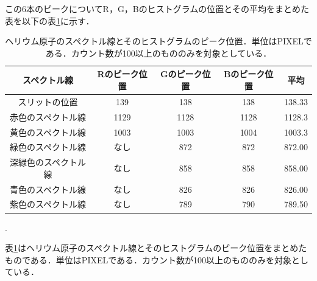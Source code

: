 \documentclass[a4paper,dvipdfmx,10.5pt]{jarticle}
\begin{document}
この6本のピークについてR，G，Bのヒストグラムの位置とその平均をまとめた表を以下の表\ref{tab:He_spectrum}に示す．
\begin{table}[htbp]
  \begin{center}
    \begin{tabular}{|c|c|c|c|c|}
       \hline
    スペクトル線 & Rのピーク位置 & Gのピーク位置 & Bのピーク位置& 平均 \\
      \hline
      スリットの位置 & 139 & 138 & 138 & 138.33 \\
    赤色のスペクトル線 & 1129 & 1128& 1128 & 1128.3 \\
    黄色のスペクトル線 & 1003 & 1003 & 1004 & 1003.3\\
    緑色のスペクトル線 & なし & 872 & 872 & 872.00 \\
    深緑色のスペクトル線 & なし & 858 & 858 & 858.00 \\
    青色のスペクトル線 & なし & 826 & 826 & 826.00 \\
    紫色のスペクトル線 & なし & 789 & 790 & 789.50 \\
    \hline
    \end{tabular}
    \caption{ヘリウム原子のスペクトル線とそのヒストグラムのピーク位置．単位はPIXELである．カウント数が100以上のもののみを対象としている．}
    .\label{tab:He_spectrum}
  \end{center}
\end{table}
表\ref{tab:He_spectrum}はヘリウム原子のスペクトル線とそのヒストグラムのピーク位置をまとめたものである．単位はPIXELである．カウント数が100以上のもののみを対象としている．
\end{document}
